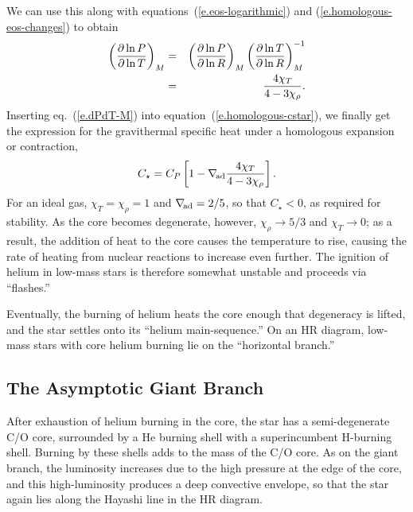 We can use this along with equations~(\ref{e.eos-logarithmic}) and (\ref{e.homologous-eos-changes}) to obtain
\begin{eqnarray}\label{e.dPdT-M}
 \left(\frac{\partial \ln P}{\partial \ln T}\right)_{M} &=& \left(\frac{\partial \ln P}{\partial \ln R}\right)_{M}\left(\frac{\partial \ln T}{\partial \ln R}\right)_{M}^{-1}\nonumber \\
 &=& \frac{4\chi_{T}}{4-3\chi_{\rho}}.
\end{eqnarray}
Inserting eq.~(\ref{e.dPdT-M}) into equation~(\ref{e.homologous-cstar}), we finally get the expression for the gravithermal specific heat under a homologous expansion or contraction,
\begin{equation}\label{e.gravithermal-specific-heat}
	C_{\star} = C_{P}\left[1 - \nabla_{\!\mathrm{ad}}\frac{4\chi_{T}}{4 - 3\chi_{\rho}}\right].
\end{equation}
For an ideal gas, $\chi_{T}=\chi_{\rho}=1$ and $\nabla_{\!\mathrm{ad}} = 2/5$, so that $C_{\star} < 0$, as required for stability.  As the core becomes degenerate, however, $\chi_{\rho} \to 5/3$ and $\chi_{T}\to 0$; as a result, the addition of heat to the core causes the temperature to rise, causing the rate of heating from nuclear reactions to increase even further.  The ignition of helium in low-mass stars is therefore somewhat unstable and proceeds via ``flashes.''

Eventually, the burning of helium heats the core enough that degeneracy is lifted, and the star settles onto its ``helium main-sequence.''  On an HR diagram, low-mass stars with core helium burning lie on the ``horizontal branch.''

\subsection{The Asymptotic Giant Branch}\label{s.agb}

After exhaustion of helium burning in the core, the star has a semi-degenerate C/O core, surrounded by a He burning shell with a superincumbent H-burning shell.  Burning by these shells adds to the mass of the C/O core. As on the giant branch, the luminosity increases due to the high pressure at the edge of the core, and this high-luminosity produces a deep convective envelope, so that the star again lies along the Hayashi line in the HR diagram. 

